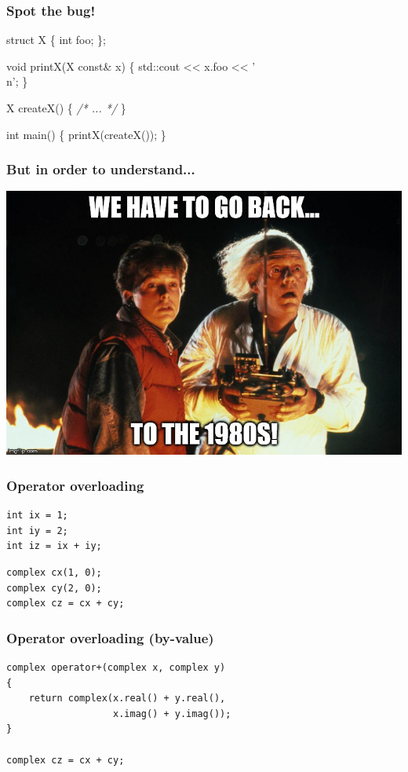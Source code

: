 \documentclass[aspectratio=43]{beamer}
\begin{document}
\begin{frame}[fragile]
  \frametitle{Spot the bug!}
  \begin{semiverbatim}
{\color{blue}struct} X \{
    {\color{blue}int} foo;
\};

{\color{blue}void} printX(X {\color{red}const}\& x) \{
    std::cout << x.foo << '\\n';
\}

X createX() \{ {\color{gray}\emph{/* ... */}} \}

{\color{blue}int} main()
\{
    printX(createX());
\}
  \end{semiverbatim}
\end{frame}


\begin{frame}
  \frametitle{But in order to understand...}
  \pause
  \begin{center}
  \includegraphics[height=.85\textheight]{resources/btt80s.jpg}
  \end{center}
\end{frame}


\begin{frame}[fragile]
  \frametitle{Operator overloading}
  \begin{lstlisting}
int ix = 1;
int iy = 2;
int iz = ix + iy;
  \end{lstlisting}
  \pause
  \begin{lstlisting}
complex cx(1, 0);
complex cy(2, 0);
complex cz = cx + cy;
  \end{lstlisting}
\end{frame}

\begin{frame}[fragile]
  \frametitle{Operator overloading (by-value)}
  \begin{lstlisting}
complex operator+(complex x, complex y)
{
    return complex(x.real() + y.real(),
                   x.imag() + y.imag());
}

complex cz = cx + cy;
  \end{lstlisting}
\end{frame}
\end{document}
